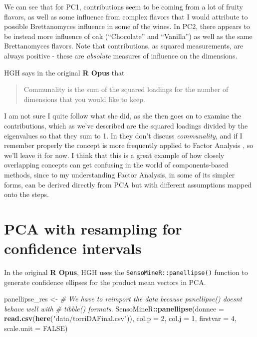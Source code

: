 \documentclass[
]{book}
\newenvironment{Shaded}{\begin{snugshade}}{\end{snugshade}}
\newcommand{\AttributeTok}[1]{\textcolor[rgb]{0.13,0.29,0.53}{#1}}
\newcommand{\CommentTok}[1]{\textcolor[rgb]{0.56,0.35,0.01}{\textit{#1}}}
\newcommand{\ConstantTok}[1]{\textcolor[rgb]{0.56,0.35,0.01}{#1}}
\newcommand{\DecValTok}[1]{\textcolor[rgb]{0.00,0.00,0.81}{#1}}
\newcommand{\FunctionTok}[1]{\textcolor[rgb]{0.13,0.29,0.53}{\textbf{#1}}}
\newcommand{\NormalTok}[1]{#1}
\newcommand{\OtherTok}[1]{\textcolor[rgb]{0.56,0.35,0.01}{#1}}
\newcommand{\SpecialCharTok}[1]{\textcolor[rgb]{0.81,0.36,0.00}{\textbf{#1}}}
\newcommand{\StringTok}[1]{\textcolor[rgb]{0.31,0.60,0.02}{#1}}
\begin{document}
We can see that for PC1, contributions seem to be coming from a lot of fruity flavors, as well as some influence from complex flavors that I would attribute to possible Brettanomyces influence in some of the wines. In PC2, there appears to be instead more influence of oak (``Chocolate'' and ``Vanilla'') as well as the same Brettanomyces flavors. Note that contributions, as squared measurements, are always positive - these are \emph{absolute} measures of influence on the dimensions.

HGH says in the original \textbf{R Opus} that

\begin{quote}
Communality is the sum of the squared loadings for the number of dimensions that you would like to keep.
\end{quote}

I am not sure I quite follow what she did, as she then goes on to examine the contributions, which as we've described are the squared loadings divided by the eigenvalues so that they sum to 1. In \citet{abdiPrincipal2010} they don't discuss \emph{communality}, and if I remember properly the concept is more frequently applied to Factor Analysis \citet{rencherMethods2002}, so we'll leave it for now. I think that this is a great example of how closely overlapping concepts can get confusing in the world of components-based methods, since to my understanding Factor Analysis, in some of its simpler forms, can be derived directly from PCA but with different assumptions mapped onto the steps.

\section{PCA with resampling for confidence intervals}\label{pca-with-resampling-for-confidence-intervals}

In the original \textbf{R Opus}, HGH uses the \texttt{SensoMineR::panellipse()} function to generate confidence ellipses for the product mean vectors in PCA.

\begin{Shaded}
\begin{Highlighting}[]
\NormalTok{panellipse\_res }\OtherTok{\textless{}{-}} 
  \CommentTok{\# We have to reimport the data because panellipse() doesn\textquotesingle{}t behave well with}
  \CommentTok{\# tibble() formats.}
\NormalTok{  SensoMineR}\SpecialCharTok{::}\FunctionTok{panellipse}\NormalTok{(}\AttributeTok{donnee =} \FunctionTok{read.csv}\NormalTok{(}\FunctionTok{here}\NormalTok{(}\StringTok{"data/torriDAFinal.csv"}\NormalTok{)), }
                         \AttributeTok{col.p =} \DecValTok{2}\NormalTok{, }\AttributeTok{col.j =} \DecValTok{1}\NormalTok{, }\AttributeTok{firstvar =} \DecValTok{4}\NormalTok{, }\AttributeTok{scale.unit =} \ConstantTok{FALSE}\NormalTok{)}
\end{Highlighting}
\end{Shaded}
\end{document}
